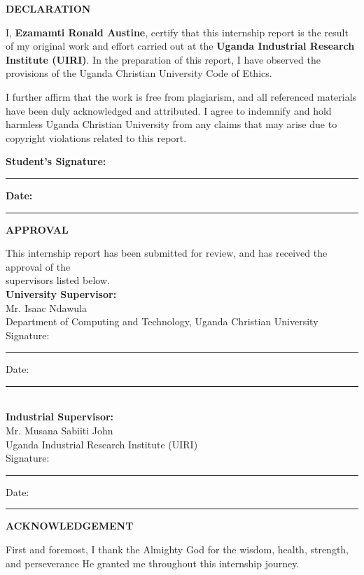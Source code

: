 \documentclass[12pt,a4paper]{report}
\begin{document}
{\fontsize{14}{16.8}\selectfont\bfseries\centering DECLARATION\par}
\vspace{10pt}
\vspace{5pt}
\noindent I, \textbf{Ezamamti Ronald Austine}, certify that this internship report is the result of my original work and effort carried out at the \textbf{Uganda Industrial Research Institute (UIRI)}. In the preparation of this report, I have observed the provisions of the Uganda Christian University Code of Ethics.

\noindent I further affirm that the work is free from plagiarism, and all referenced materials have been duly acknowledged and attributed. I agree to indemnify and hold harmless Uganda Christian University from any claims that may arise due to copyright violations related to this report.

\vspace{2cm}
\noindent \textbf{Student's Signature:} \rule{6cm}{0.2pt} \hfill \textbf{Date:} \rule{3cm}{0.2pt}

\newpage
{\fontsize{14}{16.8}\selectfont\bfseries\centering APPROVAL\par}
\vspace{10pt}
\noindent This internship report has been submitted for review, and has received the approval of the \\supervisors listed below.\\[1cm]

\noindent \textbf{University Supervisor:} \\
Mr. Isaac Ndawula       \\
Department of Computing and Technology, Uganda Christian University\\[0.5cm]
Signature: \rule{5cm}{0.2pt} \hfill Date: \rule{3cm}{0.2pt}\\[1cm]

\noindent \textbf{Industrial Supervisor:} \\
Mr. Musana Sabiiti John\\
Uganda Industrial Research Institute (UIRI)\\[0.5cm]
Signature: \rule{5cm}{0.2pt} \hfill Date: \rule{3cm}{0.2pt}

\newpage
{\fontsize{14}{16.8}\selectfont\bfseries\centering ACKNOWLEDGEMENT\par}
\vspace{10pt}
\noindent First and foremost, I thank the Almighty God for the wisdom, health, strength, and perseverance He granted me throughout this internship journey.
\end{document}
